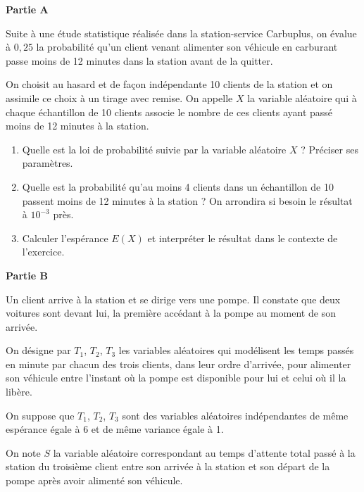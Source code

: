 \begin{Centrage}
	\textbf{Partie A}
\end{Centrage}

Suite à une étude statistique réalisée dans la station-service Carbuplus, on évalue à $0,25$ la probabilité qu'un client venant alimenter son véhicule en carburant passe moins de 12 minutes dans la station avant de la quitter.

On choisit au hasard et de façon indépendante 10 clients de la station et on assimile ce choix à un tirage avec remise. On appelle $X$ la variable aléatoire qui à chaque échantillon de 10 clients associe le nombre de ces clients ayant passé moins de 12 minutes à la station.

\begin{enumerate}
	\item Quelle est la loi de probabilité suivie par la variable aléatoire $X$ ? Préciser ses paramètres.
	\item Quelle est la probabilité qu'au moins 4 clients dans un échantillon de 10 passent moins de 12 minutes à la station ? On arrondira si besoin le résultat à $10^{-3}$ près.
	\item Calculer l'espérance $E(X)$ et interpréter le résultat dans le contexte de l'exercice.
\end{enumerate}

\begin{Centrage}
	\textbf{Partie B}
\end{Centrage}

Un client arrive à la station et se dirige vers une pompe. Il constate que deux voitures sont devant lui, la première accédant à la pompe au moment de son arrivée.

On désigne par $T_1$, $T_2$, $T_3$ les variables aléatoires qui modélisent les temps passés en minute par chacun des trois clients, dans leur ordre d'arrivée, pour alimenter son véhicule entre l'instant où la pompe est disponible pour lui et celui où il la libère.

\smallskip

On suppose que $T_1$, $T_2$, $T_3$ sont des variables aléatoires indépendantes de même espérance égale à 6 et de même variance égale à 1.

\smallskip

On note $S$ la variable aléatoire correspondant au temps d'attente total passé à la station du troisième client entre son arrivée à la station et son départ de la pompe après avoir alimenté son véhicule.

